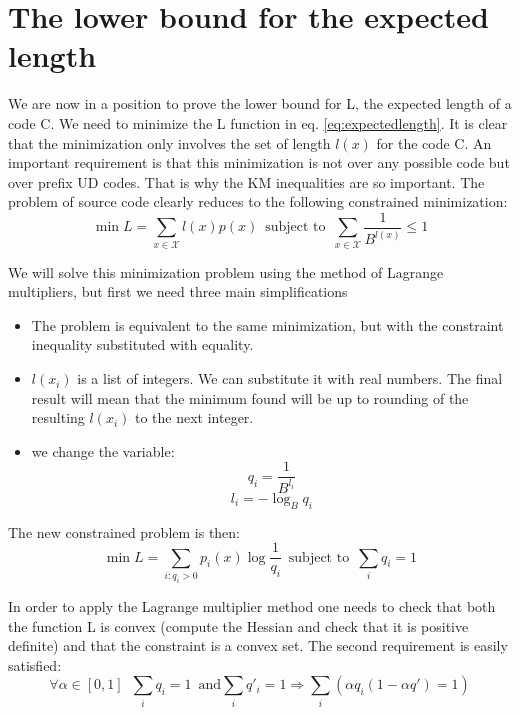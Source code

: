\section{The lower bound for the expected length}
We are now in a position to prove the lower bound for L, the expected length of a code C. \newline
We need to minimize the L function in eq. \ref{eq:expectedlength}. It is clear that the minimization only involves the set of length $l(x)$ for the code C. An important requirement is that this minimization is not over any possible code but over prefix UD codes. That is why the KM inequalities are so important. \newline
The problem of source code clearly reduces to the following constrained minimization: 
\begin{equation}
	\min 	L = \sum_{x \in \mathcal{X}}l(x)p(x) \,\,\, \text{subject to} \,\,\, 	\sum_{x \in \mathcal{X}} \frac{1}{B^{l(x)}}\le 1 
\end{equation}

We will solve this minimization problem using the method of Lagrange multipliers, but first we need three main simplifications
\begin{itemize}
	\item The problem is equivalent to the same minimization, but with the constraint inequality substituted with equality.
	\item $l(x_i)$ is a list of integers. We can substitute it with real numbers. The final result will mean that the minimum found will be up to rounding of the resulting $l(x_i)$ to the next integer. 
	\item we change the variable:
	$$q_i = \frac{1}{B^{l_i}}$$
	$$l_i = -\log_B q_i$$
\end{itemize}

The new constrained problem is then:
\begin{equation}
	\min 	L = \sum_{i: q_i > 0}p_i(x)\log\frac{1}{q_i} \,\,\, \text{subject to} \,\,\, 	\sum_i q_i =  1 
\end{equation}

In order to apply the Lagrange multiplier method one needs to check that both the function L is convex (compute the Hessian and check that it is positive definite) and that the constraint is a convex set. The second requirement is easily satisfied:
$$\forall \alpha \in [0,1]\,\,\, \sum_i q_i = 1 \,\,\, \text{and} \sum_i q'_i = 1 \Longrightarrow \sum_i (\alpha q_i (1-\alpha q') = 1) $$


